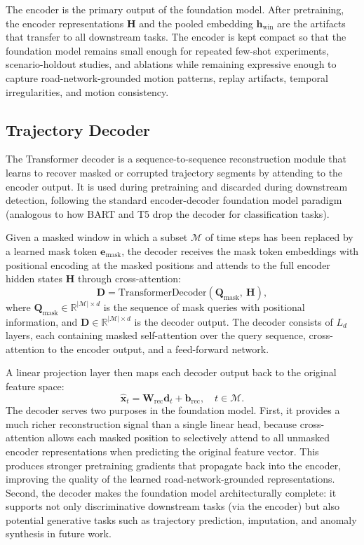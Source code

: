 \documentclass[12pt]{article}
\begin{document}
The encoder is the primary output of the foundation model. After pretraining, the encoder representations $\mathbf{H}$ and the pooled embedding $\mathbf{h}_{\text{win}}$ are the artifacts that transfer to all downstream tasks. The encoder is kept compact so that the foundation model remains small enough for repeated few-shot experiments, scenario-holdout studies, and ablations while remaining expressive enough to capture road-network-grounded motion patterns, replay artifacts, temporal irregularities, and motion consistency.

\subsection{Trajectory Decoder}\label{subsec:decoder}

The Transformer decoder is a sequence-to-sequence reconstruction module that learns to recover masked or corrupted trajectory segments by attending to the encoder output. It is used during pretraining and discarded during downstream detection, following the standard encoder-decoder foundation model paradigm (analogous to how BART and T5 drop the decoder for classification tasks).

Given a masked window in which a subset $\mathcal{M}$ of time steps has been replaced by a learned mask token $\mathbf{e}_{\text{mask}}$, the decoder receives the mask token embeddings with positional encoding at the masked positions and attends to the full encoder hidden states $\mathbf{H}$ through cross-attention:
\begin{equation}
\mathbf{D} = \text{TransformerDecoder}(\mathbf{Q}_{\text{mask}},\ \mathbf{H}),
\end{equation}
where $\mathbf{Q}_{\text{mask}} \in \mathbb{R}^{|\mathcal{M}| \times d}$ is the sequence of mask queries with positional information, and $\mathbf{D} \in \mathbb{R}^{|\mathcal{M}| \times d}$ is the decoder output. The decoder consists of $L_d$ layers, each containing masked self-attention over the query sequence, cross-attention to the encoder output, and a feed-forward network.

A linear projection layer then maps each decoder output back to the original feature space:
\begin{equation}
\hat{\mathbf{x}}_t = \mathbf{W}_{\text{rec}} \mathbf{d}_t + \mathbf{b}_{\text{rec}}, \quad t \in \mathcal{M}.
\end{equation}
The decoder serves two purposes in the foundation model. First, it provides a much richer reconstruction signal than a single linear head, because cross-attention allows each masked position to selectively attend to all unmasked encoder representations when predicting the original feature vector. This produces stronger pretraining gradients that propagate back into the encoder, improving the quality of the learned road-network-grounded representations. Second, the decoder makes the foundation model architecturally complete: it supports not only discriminative downstream tasks (via the encoder) but also potential generative tasks such as trajectory prediction, imputation, and anomaly synthesis in future work.
\end{document}
